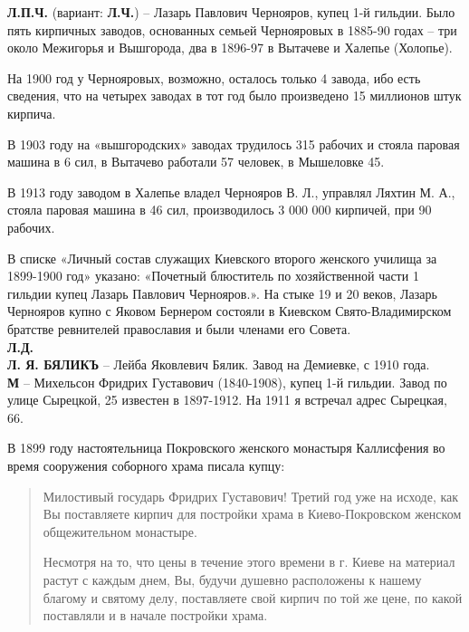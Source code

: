 
\noindent\textbf{Л.П.Ч.} (вариант: \textbf{Л.Ч.}) – Лазарь Павлович Чернояров, купец 1-й гильдии. Было пять кирпичных заводов, основанных семьей Чернояровых в 1885-90 годах – три около Межигорья и Вышгорода, два в 1896-97 в Вытачеве и Халепье (Холопье). 

На 1900 год у Чернояровых, возможно, осталось только 4 завода, ибо есть сведения, что на четырех заводах в тот год было произведено 15 миллионов штук кирпича.

В 1903 году на «вышгородских» заводах трудилось 315 рабочих и стояла паровая машина в 6 сил, в Вытачево работали 57 человек, в Мышеловке 45.

В 1913 году заводом в Халепье владел Чернояров В. Л., управлял Ляхтин М. А., стояла паровая машина в 46 сил, производилось 3 000 000 кирпичей, при 90 рабочих.

В списке «Личный состав служащих Киевского второго женского училища за 1899-1900 год» указано: «Почетный блюститель по хозяйственной части 1 гильдии купец Лазарь Павлович Чернояров.». На стыке 19 и 20 веков, Лазарь Чернояров купно с Яковом Бернером состояли в Киевском Свято-Владимирском братстве ревнителей православия и были членами его Совета.\\

\noindent\textbf{Л.Д.}\\

\noindent\textbf{Л. Я. БЯЛИКЪ} – Лейба Яковлевич Бялик. Завод на Демиевке, с 1910 года.\\

\noindent\textbf{М} – Михельсон Фридрих Густавович (1840-1908), купец 1-й гильдии. Завод по улице Сырецкой, 25 известен в 1897-1912. На 1911 я встречал адрес Сырецкая, 66.

В 1899 году настоятельница Покровского женского монастыря Каллисфения во время сооружения соборного храма писала купцу:

\begin{quotation}
Милостивый государь Фридрих Густавович! Третий год уже на исходе, как Вы поставляете кирпич для постройки храма в Киево-Покров\-ском женском общежительном монастыре. 

Несмотря на то, что цены в течение этого времени в г. Киеве на материал растут с каждым днем, Вы, будучи душевно расположены к нашему благому и святому делу, поставляете свой кирпич по той же цене, по какой поставляли и в начале постройки храма.
\end{quotation}

